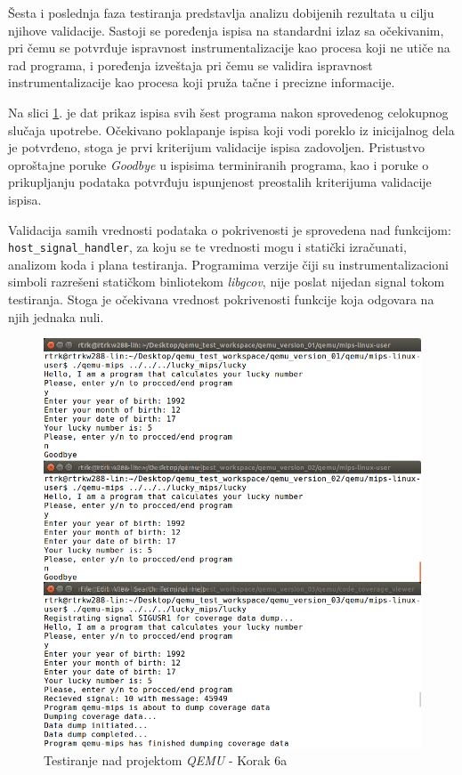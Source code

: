 \documentclass[12pt,oneside]{memoir}
\newcommand{\kod}[1]{\texttt{#1}}
\newcommand{\strano}[1]{\textit{#1}}
\begin{document}
Šesta i poslednja faza testiranja predstavlja analizu dobijenih rezultata u cilju njihove validacije. Sastoji se poređenja ispisa na standardni izlaz sa očekivanim, pri čemu se potvrđuje ispravnost instrumentalizacije kao procesa koji ne utiče na rad programa, i  poređenja izveštaja pri čemu se validira ispravnost instrumentalizacije kao procesa koji pruža tačne i precizne informacije. 

Na slici \ref{fig:qemu-test-6a}. je dat prikaz ispisa svih šest programa nakon sprovedenog celokupnog slučaja upotrebe. Očekivano poklapanje ispisa koji vodi poreklo iz inicijalnog dela je potvrđeno, stoga je prvi kriterijum validacije ispisa zadovoljen. Pristustvo oproštajne poruke \strano{Goodbye} u ispisima terminiranih programa, kao i poruke o prikupljanju podataka
potvrđuju ispunjenost preostalih kriterijuma validacije ispisa.

Validacija samih vrednosti podataka o pokrivenosti je sprovedena nad funkcijom: \kod{host\_signal\_handler}, za koju se te vrednosti mogu i statički izračunati, analizom koda i plana testiranja. Programima verzije čiji su instrumentalizacioni simboli razrešeni statičkom binliotekom \strano{libgcov}, nije poslat nijedan signal tokom testiranja. Stoga je očekivana vrednost pokrivenosti funkcije koja odgovara na njih jednaka nuli. 

\begin{figure}[!ht]
  \centering
  \includegraphics[width=\textwidth]{img/qemu-test-6a-ng.png}
  \caption{Testiranje nad projektom \strano{QEMU} - Korak 6a}
  \label{fig:qemu-test-6a}
\end{figure} 
\end{document}

